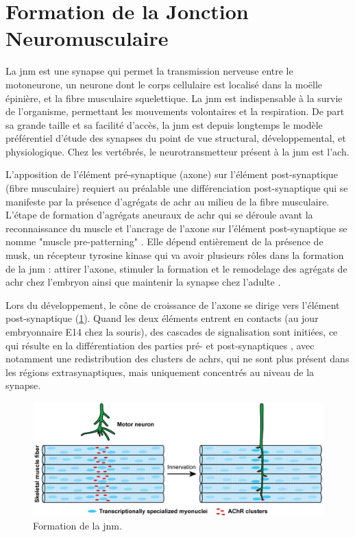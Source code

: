   
\section{Formation de la Jonction Neuromusculaire}
\label{sec:IntroSynapse}
	La \gls{jnm} est une synapse qui permet la transmission nerveuse entre le motoneurone, un neurone dont le corps cellulaire est localisé dans la moëlle épinière, et la fibre musculaire squelettique. La \gls{jnm} est indispensable à la survie de l'organisme, permettant les mouvements volontaires et la respiration. De part sa grande taille et sa facilité d'accès, la \gls{jnm} est depuis longtemps le modèle préférentiel d'étude des synapses du point de vue structural, développemental, et physiologique. Chez les vertébrés, le neurotransmetteur présent à la \gls{jnm} est l'\gls{ach}. 

	L'apposition de l'élément pré-synaptique (axone) sur l'élément post-synaptique (fibre musculaire) requiert au préalable une différenciation post-synaptique qui se manifeste par la présence d'agrégats de \gls{achr} au milieu de la fibre musculaire. L'étape de formation d'agrégats aneuraux de \gls{achr} qui se déroule avant la reconnaissance du muscle et l'ancrage de l'axone sur l'élément post-synaptique se nomme "muscle pre-patterning" \cite{Wu2010a, Gordon2012}. Elle dépend entièrement de la présence de \gls{musk}, un récepteur tyrosine kinase qui va avoir plusieurs rôles dans la formation de la \gls{jnm} : attirer l'axone, stimuler la formation et le remodelage des agrégats de \gls{achr} chez l'embryon ainsi que maintenir la synapse chez l'adulte \cite{Hesser2006}.

	Lors du développement, le cône de croissance de l'axone se dirige vers l'élément post-synaptique (\cref{fig:FormaJNM}). Quand les deux éléments entrent en contacts (au jour embryonnaire E14 chez la souris), des cascades de signalisation sont initiées, ce qui résulte en la différentiation des parties pré- et post-synaptiques \cite{Sanes1999}, avec notamment une redistribution des clusters de \glspl{achr}, qui ne sont plus présent dans les régions extrasynaptiques, mais uniquement concentrés au niveau de la synapse.

	\begin{figure}[h]
		\includegraphics[width=\textwidth]{./Images/formation_jnm.png}
		\caption{Formation de la \gls{jnm}.} 
		\label{fig:FormaJNM}
	\end{figure}

